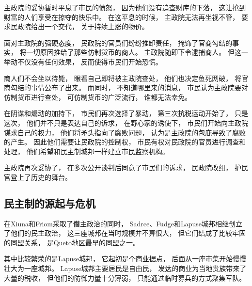 \documentclass[UTF8,12pt]{ctexbook}
\begin{document}
                主政院的妥协暂时平息了市民的愤怒，
                因为他们没有追查财库的下落，
                这让抢到财富的人们享受在掠夺的快乐中。
                在这平息的时候，
                主政院无法再坐视不管，
                要求民政院给出一个交代，
                关于持续上涨的物价。

                面对主政院的强硬态度，
                民政院的官员们纷纷推卸责任，
                掩饰了官商勾结的事实，
                将一切原因推给了那些仿制货币的商人。
                主政院随即下令逮捕商人。
                但这一举动不仅没有任何效果，
                反而使得市民们开始恐慌。

                商人们不会坐以待毙，
                眼看自己即将被主政院查处，
                他们也决定鱼死网破，
                将官商勾结的事情公布了出来。
                而同时，
                不知道哪里来的消息，
                市民认为主政院要对仿制货币进行查处，
                可仿制货币的广泛流行，
                谁都无法幸免。

                在阴谋和煽动的加持下，
                市民们再次选择了暴动，
                第三次抗税运动开始了，
                只是这次，
                他们并不只是表达自己的诉求，
                在野心家的诱使下，
                市民们开始向主政院谋求自己的权力，
                他们将矛头指向了腐败问题，
                认为是主政院的包庇导致了腐败的产生。
                因此他们需要让民政院的控制权，
                市民有权对民政院的官员进行调查和处理，
                他们希望和民主制城邦一样建立市民监察机构。

                主政院再次妥协了，
                在多次公开谈判后同意了市民们的诉求，
                民政院改组，
                护民官登上了历史的舞台。
            \subsection{民主制的源起与危机}

            在Xiuna和Friom采取了僭主政治的同时，
            Sadrce、Fudge和Lapuse城邦相继创立了他们的民主政治，
            这三座城邦在当时规模并不算很大，
            但它们结成了比较牢固的同盟关系，
            是Queto地区最早的同盟之一。

            其中比较繁荣的是Lapuse城邦，
            它起初是个商业据点，
            后面从一座市集开始慢慢壮大为一座城邦。
            Lapuse城邦主要居民是自由民，
            发达的商业为当地贵族带来了大量的税收，
            但他们的防御力量十分薄弱，
            只能通过临时募兵的方式聚集军队。
\end{document}
